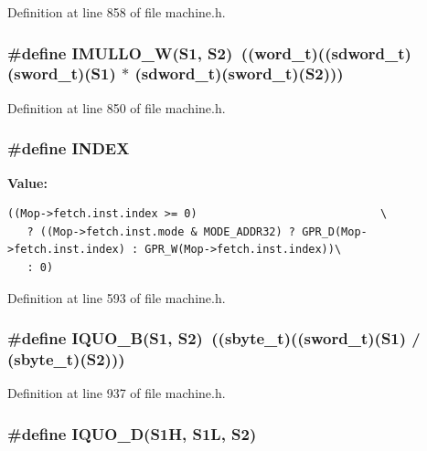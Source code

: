Definition at line 858 of file machine.h.
\subsubsection[{IMULLO\_\-W}]{\setlength{\rightskip}{0pt plus 5cm}\#define IMULLO\_\-W(S1, \/  S2)~(({\bf word\_\-t})(({\bf sdword\_\-t})({\bf sword\_\-t})(S1) $\ast$ ({\bf sdword\_\-t})({\bf sword\_\-t})(S2)))}\label{machine_8h_b7458d4e4e6eb7eef28b83d452cb7990}




Definition at line 850 of file machine.h.
\subsubsection[{INDEX}]{\setlength{\rightskip}{0pt plus 5cm}\#define INDEX}\label{machine_8h_c6885dbfb371c33e523c7fb046118b36}


\textbf{Value:}

\begin{Code}\begin{verbatim}((Mop->fetch.inst.index >= 0)                            \
   ? ((Mop->fetch.inst.mode & MODE_ADDR32) ? GPR_D(Mop->fetch.inst.index) : GPR_W(Mop->fetch.inst.index))\
   : 0)
\end{verbatim}
\end{Code}


Definition at line 593 of file machine.h.
\subsubsection[{IQUO\_\-B}]{\setlength{\rightskip}{0pt plus 5cm}\#define IQUO\_\-B(S1, \/  S2)~(({\bf sbyte\_\-t})(({\bf sword\_\-t})(S1) / ({\bf sbyte\_\-t})(S2)))}\label{machine_8h_3c7db48508068e2ccb37e009044c2262}




Definition at line 937 of file machine.h.
\subsubsection[{IQUO\_\-D}]{\setlength{\rightskip}{0pt plus 5cm}\#define IQUO\_\-D(S1H, \/  S1L, \/  S2)}\label{machine_8h_e023a70dceef3c0fc834a50854f2325c}


